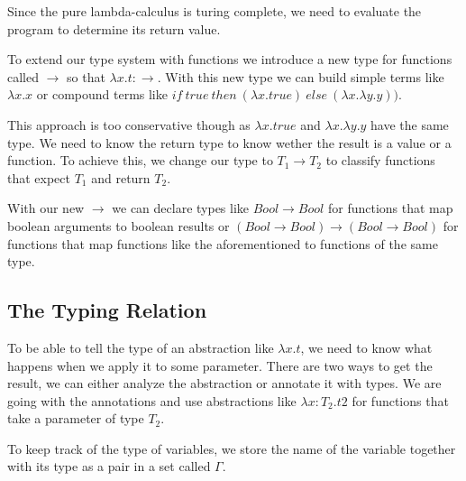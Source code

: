 \documentclass[acmlarge]{acmart}
\begin{document}
Since the pure lambda-calculus is turing complete, we need to evaluate the program to determine its return value.

To extend our type system with functions we introduce a new type for functions called $\rightarrow$ so that $\lambda x.t : \rightarrow$. With this new type we can build simple terms like $\lambda x.x$ or compound terms like $if\ true\ then\ (\lambda x.true)\ else\ (\lambda x. \lambda y.y))$.

This approach is too conservative though as $\lambda x.true$ and $\lambda x. \lambda y.y$ have the same type. We need to know the return type to know wether the result is a value or a function. To achieve this, we change our type to $T_1 \rightarrow T_2$ to classify functions that expect $T_1$ and return $T_2$.

With our new $\rightarrow$ we can declare types like $Bool \rightarrow Bool$ for functions that map boolean arguments to boolean results or $(Bool \rightarrow Bool) \rightarrow (Bool \rightarrow Bool)$ for functions that map functions like the aforementioned to functions of the same type.

\subsection{The Typing Relation}

To be able to tell the type of an abstraction like $\lambda x.t$, we need to know what happens when we apply it to some parameter. There are two ways to get the result, we can either analyze the abstraction or annotate it with types. We are going with the annotations and use abstractions like $\lambda x : T_2 . t2$ for functions that take a parameter of type $T_2$.

To keep track of the type of variables, we store the name of the variable together with its type as a pair in a set called $\Gamma$.



\end{document}
